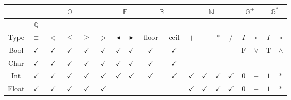 \documentclass{jsarticle}
\newcommand{\htypeclassname}[1]{\mathbb{#1}}
\newcommand{\heq}{\equiv}
\newcommand{\hsucc}{\blacktriangleright}
\newcommand{\hpred}{\blacktriangleleft}
\newcommand{\hmin}{\mathop{\text{floor}}}
\newcommand{\hmax}{\mathop{\text{ceil}}}
\newcommand{\identity}{I}
\newcommand{\binaryop}{\circ}
\newcommand{\htrue}{\text{T}}
\newcommand{\hfalse}{\text{F}}
\begin{document}
\begin{center}
\begin{tabular}{||c||c|c|c|c|c|c|c|c|c|c|c|c|c|c|c|c|c||}
\hline
{ }
    &\multicolumn{5}{|c|}{$\htypeclassname{O}$}
    &\multicolumn{2}{|c|}{$\htypeclassname{E}$}
    &\multicolumn{2}{|c|}{$\htypeclassname{B}$}
    &\multicolumn{4}{|c|}{$\htypeclassname{N}$}
    &\multicolumn{2}{|c|}{$\htypeclassname{G}^+$}
    &\multicolumn{2}{|c||}{$\htypeclassname{G}^*$}\\
\hline
{ }
    &$\htypeclassname{Q}$
    &\multicolumn{4}{|c|}{ }
    &\multicolumn{2}{|c|}{ }
    &\multicolumn{2}{|c|}{ }
    &\multicolumn{4}{|c|}{ }
    &\multicolumn{2}{|c|}{ }
    &\multicolumn{2}{|c||}{ }\\
\hline
Type
    &$\heq$
    &$<$
    &$\le$
    &$\ge$
    &$>$
    &$\hpred$
    &$\hsucc$
    &$\hmin$
    &$\hmax$
    &$+$
    &$-$
    &$*$
    &$/$
    &$\identity$
    &$\binaryop$
    &$\identity$
    &$\binaryop$\\
\hline\hline
Bool
    &$\checkmark$
    &$\checkmark$
    &$\checkmark$
    &$\checkmark$
    &$\checkmark$
    &$\checkmark$
    &$\checkmark$
    &$\checkmark$
    &$\checkmark$
    &
    &
    &
    &
    &$\hfalse$
    &$\vee$
    &$\htrue$
    &$\wedge$\\
\hline
Char
    &$\checkmark$
    &$\checkmark$
    &$\checkmark$
    &$\checkmark$
    &$\checkmark$
    &$\checkmark$
    &$\checkmark$
    &$\checkmark$
    &$\checkmark$
    &
    &
    &
    &
    &
    &
    &
    &\\
\hline
Int
    &$\checkmark$
    &$\checkmark$
    &$\checkmark$
    &$\checkmark$
    &$\checkmark$
    &$\checkmark$
    &$\checkmark$
    &$\checkmark$
    &$\checkmark$
    &$\checkmark$
    &$\checkmark$
    &$\checkmark$
    &$\checkmark$
    &$0$
    &$+$
    &$1$
    &$\ast$\\
\hline
Float
    &$\checkmark$
    &$\checkmark$
    &$\checkmark$
    &$\checkmark$
    &$\checkmark$
    &
    &
    &
    &
    &$\checkmark$
    &$\checkmark$
    &$\checkmark$
    &$\checkmark$
    &$0$
    &$+$
    &$1$
    &$\ast$\\
\hline
\end{tabular}
\end{center}
\end{document}
